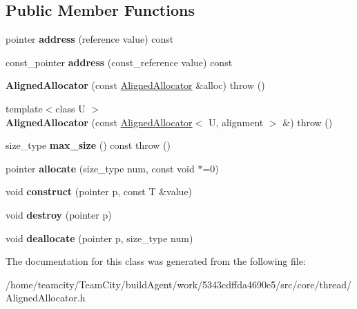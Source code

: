 \subsection*{Public Member Functions}
\begin{DoxyCompactItemize}
\item 
pointer {\bfseries address} (reference value) const \hypertarget{classAlignedAllocator_a6e8856fc7ca2324ecb345d5f8a1a1492}{}\label{classAlignedAllocator_a6e8856fc7ca2324ecb345d5f8a1a1492}

\item 
const\+\_\+pointer {\bfseries address} (const\+\_\+reference value) const \hypertarget{classAlignedAllocator_adc90b489475b44c27664a0bb7036e8f5}{}\label{classAlignedAllocator_adc90b489475b44c27664a0bb7036e8f5}

\item 
{\bfseries Aligned\+Allocator} (const \hyperlink{classAlignedAllocator}{Aligned\+Allocator} \&alloc)  throw ()\hypertarget{classAlignedAllocator_aefcbc30120c4a8080a04cb0256ccbd94}{}\label{classAlignedAllocator_aefcbc30120c4a8080a04cb0256ccbd94}

\item 
{\footnotesize template$<$class U $>$ }\\{\bfseries Aligned\+Allocator} (const \hyperlink{classAlignedAllocator}{Aligned\+Allocator}$<$ U, alignment $>$ \&)  throw ()\hypertarget{classAlignedAllocator_a99d45b93a0a0e7a229cc0c1b954f21f0}{}\label{classAlignedAllocator_a99d45b93a0a0e7a229cc0c1b954f21f0}

\item 
size\+\_\+type {\bfseries max\+\_\+size} () const   throw ()\hypertarget{classAlignedAllocator_a8f70adbcd8e274ae18224f1204a3cb4e}{}\label{classAlignedAllocator_a8f70adbcd8e274ae18224f1204a3cb4e}

\item 
pointer {\bfseries allocate} (size\+\_\+type num, const void $\ast$=0)\hypertarget{classAlignedAllocator_afaa32dfd9b767ceccba057b0fdf9e8b9}{}\label{classAlignedAllocator_afaa32dfd9b767ceccba057b0fdf9e8b9}

\item 
void {\bfseries construct} (pointer p, const T \&value)\hypertarget{classAlignedAllocator_a9c352b5d0c908f15d869b2555211d6eb}{}\label{classAlignedAllocator_a9c352b5d0c908f15d869b2555211d6eb}

\item 
void {\bfseries destroy} (pointer p)\hypertarget{classAlignedAllocator_a46bb788a20e8166d20ccd4e3f47e48b1}{}\label{classAlignedAllocator_a46bb788a20e8166d20ccd4e3f47e48b1}

\item 
void {\bfseries deallocate} (pointer p, size\+\_\+type num)\hypertarget{classAlignedAllocator_afcdd0473a1bf2cd63800b047d8d540ae}{}\label{classAlignedAllocator_afcdd0473a1bf2cd63800b047d8d540ae}

\end{DoxyCompactItemize}


The documentation for this class was generated from the following file\+:\begin{DoxyCompactItemize}
\item 
/home/teamcity/\+Team\+City/build\+Agent/work/5343cdffda4690e5/src/core/thread/Aligned\+Allocator.\+h\end{DoxyCompactItemize}
